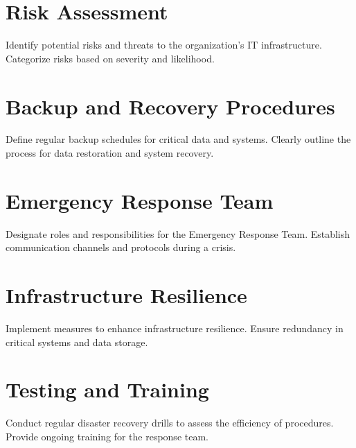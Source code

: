 \section{Risk Assessment}

Identify potential risks and threats to the organization's IT infrastructure.
Categorize risks based on severity and likelihood.

\section{Backup and Recovery Procedures}
Define regular backup schedules for critical data and systems.
Clearly outline the process for data restoration and system recovery.

\section{Emergency Response Team}
Designate roles and responsibilities for the Emergency Response Team.
Establish communication channels and protocols during a crisis.

\section{Infrastructure Resilience}
Implement measures to enhance infrastructure resilience.
Ensure redundancy in critical systems and data storage.

\section{Testing and Training}
Conduct regular disaster recovery drills to assess the efficiency of procedures.
Provide ongoing training for the response team.